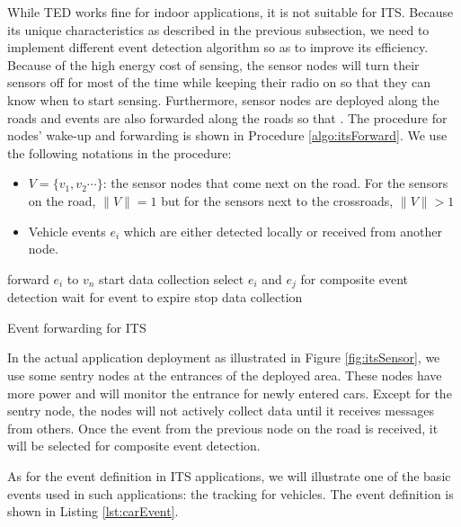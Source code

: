 While TED works fine for indoor applications, it is not suitable for ITS. Because its unique characteristics as described in the previous subsection, we need to implement different event detection algorithm so as to improve its efficiency. Because of the high energy cost of sensing, the sensor nodes will turn their sensors off for most of the time while keeping their radio on so that they can know when to start sensing. Furthermore, sensor nodes are deployed along the roads and events are also forwarded along the roads so that . The procedure for nodes' wake-up and forwarding is shown in Procedure \ref{algo:itsForward}. We use the following notations in the procedure:
\begin{itemize}
\item \(V=\{v_1, v_2 \cdots \}\): the sensor nodes that come next on the road. For the sensors on the road, \(\|V\|=1\) but for the sensors next to the crossroads, \(\|V\|>1\)
\item Vehicle events \(e_i\) which are either detected locally or received from another node.
\end{itemize}

\begin{algorithm}
\begin{algorithmic}
			\STATE forward \(e_i\) to \(v_n\)
		\ENDFOR
	\ENDIF
		\STATE start data collection
			\STATE select \(e_i\) and \(e_j\) for composite event detection
		\ELSE
			\STATE wait for event to expire
		\ENDIF
		\STATE stop data collection
	\ENDIF
\end{algorithmic}
\caption{Event forwarding for ITS}
\label{algo:itsForward}
\end{algorithm}

In the actual application deployment as illustrated in Figure \ref{fig:itsSensor}, we use some sentry nodes at the entrances of the deployed area. These nodes have more power and will monitor the entrance for newly entered cars. Except for the sentry node, the nodes will not actively collect data until it receives messages from others. Once the event from the previous node on the road is received, it will be selected for composite event detection.

As for the event definition in ITS applications, we will illustrate one of the basic events used in such applications: the tracking for vehicles. The event definition is shown in Listing \ref{lst:carEvent}.

